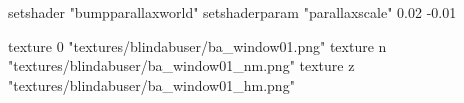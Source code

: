 	setshader "bumpparallaxworld"
	setshaderparam "parallaxscale" 0.02 -0.01

		texture 0 "textures/blindabuser/ba_window01.png"
		texture n "textures/blindabuser/ba_window01_nm.png"
		texture z "textures/blindabuser/ba_window01_hm.png"
